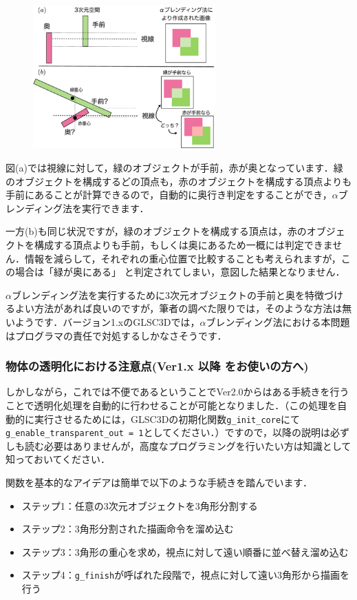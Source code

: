 \documentclass[platex,a4paper,12pt]{jsarticle}%
\begin{document}
\begin{figure}
\vspace{-1\baselineskip}
	\includegraphics[width=70mm]{005.eps}
\end{figure}

図(a)では視線に対して，緑のオブジェクトが手前，赤が奥となっています．緑のオブジェクトを構成するどの頂点も，赤のオブジェクトを構成する頂点よりも手前にあることが計算できるので，自動的に奥行き判定をすることができ，$\alpha$ブレンディング法を実行できます．

一方(b)も同じ状況ですが，緑のオブジェクトを構成する頂点は，赤のオブジェクトを構成する頂点よりも手前，もしくは奥にあるため一概には判定できません．情報を減らして，それぞれの重心位置で比較することも考えられますが，この場合は「緑が奥にある」
と判定されてしまい，意図した結果となりません．

$\alpha$ブレンディング法を実行するために3次元オブジェクトの手前と奥を特徴づけるよい方法があれば良いのですが，筆者の調べた限りでは，そのような方法は無いようです．バージョン1.xのGLSC3Dでは，$\alpha$ブレンディング法における本問題はプログラマの責任で対処するしかなさそうです．

\subsubsection{物体の透明化における注意点(Ver1.x 以降 をお使いの方へ)}

しかしながら，これでは不便であるということでVer2.0からはある手続きを行うことで透明化処理を自動的に行わせることが可能となりました．（この処理を自動的に実行させるためには，GLSC3Dの初期化関数\verb|g_init_core|にて\verb|g_enable_transparent_out = 1|としてください．）ですので，以降の説明は必ずしも読む必要はありませんが，高度なプログラミングを行いたい方は知識として知っておいてください．

関数を基本的なアイデアは簡単で以下のような手続きを踏んでいます．
\begin{itemize}
\item ステップ1：任意の3次元オブジェクトを3角形分割する
\item ステップ2：3角形分割された描画命令を溜め込む
\item ステップ3：3角形の重心を求め，視点に対して遠い順番に並べ替え溜め込む
\item ステップ4：\verb|g_finish|が呼ばれた段階で，視点に対して遠い3角形から描画を行う
\end{itemize}
\end{document}
